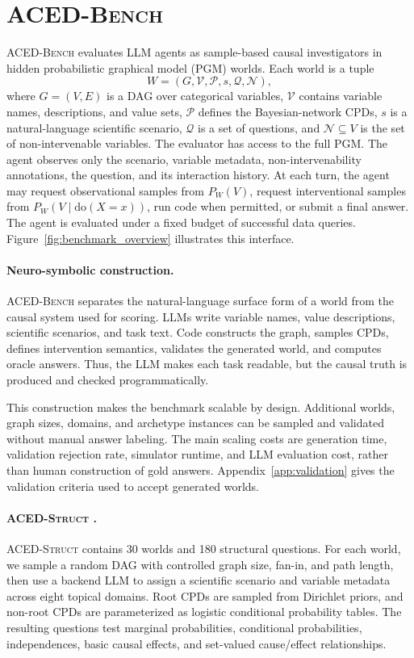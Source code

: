 \documentclass{article}
\newcommand{\bench}{\textsc{ACED-Bench} }
\newcommand{\pgmstruct}{\textsc{ACED-Struct} }
\begin{document}
\section{\bench}
\label{sec:benchmark}

\bench evaluates LLM agents as sample-based causal investigators in hidden probabilistic graphical model (PGM) worlds.
Each world is a tuple
\[
    W = (G, \mathcal{V}, \mathcal{P}, s, \mathcal{Q}, \mathcal{N}),
\]
where $G=(V,E)$ is a DAG over categorical variables, $\mathcal{V}$ contains variable names, descriptions, and value sets, $\mathcal{P}$ defines the Bayesian-network CPDs, $s$ is a natural-language scientific scenario, $\mathcal{Q}$ is a set of questions, and $\mathcal{N}\subseteq V$ is the set of non-intervenable variables.
The evaluator has access to the full PGM.
The agent observes only the scenario, variable metadata, non-intervenability annotations, the question, and its interaction history.
At each turn, the agent may request observational samples from $P_W(V)$, request interventional samples from $P_W(V\mid \mathrm{do}(X=x))$, run code when permitted, or submit a final answer.
The agent is evaluated under a fixed budget of successful data queries.
Figure~\ref{fig:benchmark_overview} illustrates this interface.

\paragraph{Neuro-symbolic construction.}
\bench separates the natural-language surface form of a world from the causal system used for scoring.
LLMs write variable names, value descriptions, scientific scenarios, and task text.
Code constructs the graph, samples CPDs, defines intervention semantics, validates the generated world, and computes oracle answers.
Thus, the LLM makes each task readable, but the causal truth is produced and checked programmatically.

This construction makes the benchmark scalable by design.
Additional worlds, graph sizes, domains, and archetype instances can be sampled and validated without manual answer labeling.
The main scaling costs are generation time, validation rejection rate, simulator runtime, and LLM evaluation cost, rather than human construction of gold answers.
Appendix~\ref{app:validation} gives the validation criteria used to accept generated worlds.

\paragraph{\pgmstruct.}
\pgmstruct contains 30 worlds and 180 structural questions.
For each world, we sample a random DAG with controlled graph size, fan-in, and path length, then use a backend LLM to assign a scientific scenario and variable metadata across eight topical domains.
Root CPDs are sampled from Dirichlet priors, and non-root CPDs are parameterized as logistic conditional probability tables.
The resulting questions test marginal probabilities, conditional probabilities, independences, basic causal effects, and set-valued cause/effect relationships.
\end{document}

